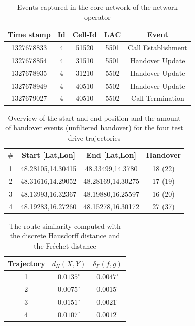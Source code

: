 \documentclass[twocolumn]{bmcart}%
\begin{document}
\begin{backmatter}
	\begin{table}[h]
		\caption{Events captured in the core network of the network operator}
		\begin{tabular}{|c|c|c|c|c|}
			\hline
			Time stamp & Id & Cell-Id & LAC  & Event              \\ \hline
			1327678833 & 4  & 51520   & 5501 & Call Establishment \\
			1327678854 & 4  & 31510   & 5501 & Handover Update    \\
			1327678935 & 4  & 31210   & 5502 & Handover Update    \\
			1327678949 & 4  & 40510   & 5502 & Handover Update    \\
			1327679027 & 4  & 40510   & 5502 & Call Termination   \\ \hline
		\end{tabular}
		\label{table:events}
	\end{table}
	
	\begin{table}[h]
		\caption{Overview of the start and end position and the amount of handover events (unfiltered handover) for the four test drive trajectories}
		\begin{tabular}{|c|c|c|c|}
			\hline
			\textbf{$\#$} & \textbf{Start [Lat,Lon]} & \textbf{End [Lat,Lon]} & \textbf{Handover} \\ \hline
			1             & 48.28105,14.30415        & 48.33499,14.3780       & 18 (22)           \\ %
			2             & 48.31616,14.29052        & 48.28169,14.30275      & 17 (19)           \\  %
			3             & 48.13993,16.32367        & 48.19880,16.25597      & 16 (20)           \\ %
			4             & 48.19283,16.27260        & 48.15278,16.30172      & 27 (37)           \\  \hline %
		\end{tabular}
		\label{table:tracks}
	\end{table}
	
	
	\begin{table}[h]
		\caption{The route similarity computed with the discrete Hausdorff distance and the Fr\'{e}chet distance}
		\begin{tabular}{|c|c|c|}
			\hline
			\textbf{Trajectory} & \textbf{$d_{H}(X,Y)$ } & \textbf{$\delta_F(f,g)$} \\ \hline
			1                   & $0.0135^\circ$         & $0.0047^\circ$           \\ %
			2                   & $0.0075^\circ$         & $0.0015^\circ$           \\  %
			3                   & $0.0151^\circ$         & $0.0021^\circ$           \\ %
			4                   & $0.0107^\circ$         & $0.0012^\circ$           \\  \hline %
		\end{tabular}
		\label{table:routesim}
	\end{table}
	

\end{backmatter}
\end{document}
